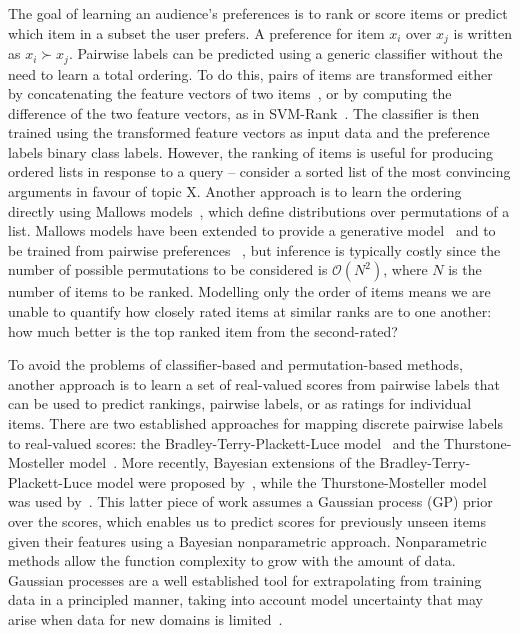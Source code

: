 The goal of learning an audience's preferences is to rank or score items or 
predict which item in a subset the user prefers. 
A preference for item $x_i$ over $x_j$ is written as $x_i \succ x_j$.
Pairwise labels can be predicted using a generic classifier without the need to learn a total ordering.
To do this, pairs of items are transformed either by concatenating the feature vectors of two items~\cite{habernal2016argument}, 
or by computing the difference of the two feature vectors, as in SVM-Rank~\cite{joachims2002optimizing}. 
The classifier is then trained using the transformed feature vectors as input data and 
the preference labels binary class labels.
However, the ranking of items is useful for producing ordered lists in response to a query -- 
consider a sorted list of the most convincing arguments in favour of topic X.
Another approach is to learn the ordering directly using Mallows models~\cite{mallows1957non},
which define distributions over permutations of a list. 
Mallows models have been extended to provide a generative model~\cite{qin2010new} and 
to be trained from pairwise preferences %
~\cite{lu2011learning}, but inference is typically costly
since the number of possible permutations to be considered is $\mathcal{O}(N^2)$, 
where $N$ is the number of items to be ranked. 
Modelling only the order of items means we are unable to quantify 
how closely rated items at similar ranks are to one another: how much better is the top ranked item 
from the second-rated?

To avoid the problems of classifier-based and permutation-based methods, 
another approach is to learn a set of real-valued scores from pairwise labels
that can be used to predict rankings, pairwise labels, or as ratings for individual items.
There are two established approaches for mapping discrete pairwise labels to real-valued scores:
the Bradley-Terry-Plackett-Luce model~\cite{bradley1952rank,luce1959possible,plackett1975analysis}
and the Thurstone-Mosteller model~\cite{thurstone1927law,mosteller2006remarks}.
More recently, Bayesian extensions of the Bradley-Terry-Plackett-Luce model
were proposed by~\cite{guiver2009bayesian,volkovs_new_2014}, 
while the Thurstone-Mosteller model was used by~\cite{chu2005preference}.
This latter piece of work assumes a Gaussian process (GP) prior over the scores,
which enables us to predict scores for previously unseen items given their features 
using a Bayesian nonparametric approach.
Nonparametric methods allow the function complexity to grow with the amount of data. 
Gaussian processes are a well established tool for extrapolating from training data 
in a principled manner, taking into account model uncertainty that may arise when 
data for new domains is limited~\cite{rasmussen_gaussian_2006}.

